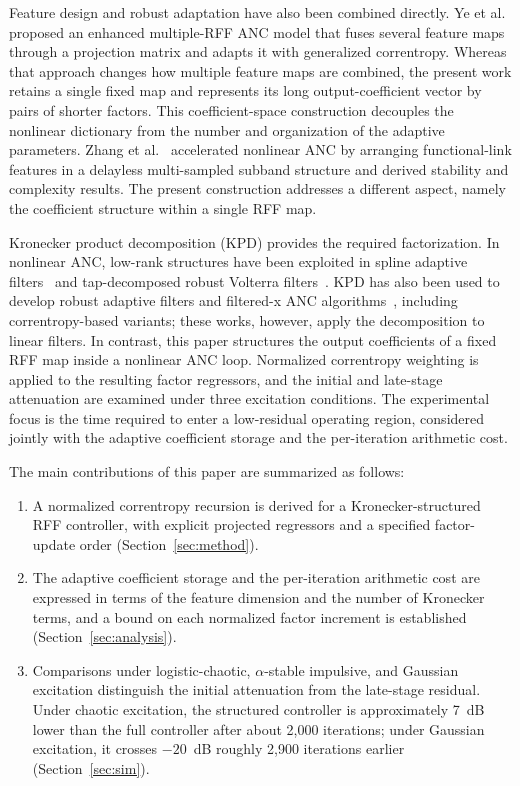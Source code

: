 \documentclass[preprint,12pt]{elsarticle}
\begin{document}
Feature design and robust adaptation have also been combined directly. Ye et al.~\cite{ye2025} proposed an enhanced multiple-RFF ANC model that fuses several feature maps through a projection matrix and adapts it with generalized correntropy. Whereas that approach changes how multiple feature maps are combined, the present work retains a single fixed map and represents its long output-coefficient vector by pairs of shorter factors. This coefficient-space construction decouples the nonlinear dictionary from the number and organization of the adaptive parameters. Zhang et al.~\cite{zhang2023} accelerated nonlinear ANC by arranging functional-link features in a delayless multi-sampled subband structure and derived stability and complexity results. The present construction addresses a different aspect, namely the coefficient structure within a single RFF map.

Kronecker product decomposition (KPD) provides the required factorization. In nonlinear ANC, low-rank structures have been exploited in spline adaptive filters~\cite{bhatta2022} and tap-decomposed robust Volterra filters~\cite{yin2024}. KPD has also been used to develop robust adaptive filters and filtered-x ANC algorithms~\cite{bhatta2020,li2025,lee2025}, including correntropy-based variants; these works, however, apply the decomposition to linear filters. In contrast, this paper structures the output coefficients of a fixed RFF map inside a nonlinear ANC loop. Normalized correntropy weighting is applied to the resulting factor regressors, and the initial and late-stage attenuation are examined under three excitation conditions. The experimental focus is the time required to enter a low-residual operating region, considered jointly with the adaptive coefficient storage and the per-iteration arithmetic cost.

The main contributions of this paper are summarized as follows:
\begin{enumerate}
\item A normalized correntropy recursion is derived for a Kronecker-structured RFF controller, with explicit projected regressors and a specified factor-update order (Section~\ref{sec:method}).
\item The adaptive coefficient storage and the per-iteration arithmetic cost are expressed in terms of the feature dimension and the number of Kronecker terms, and a bound on each normalized factor increment is established (Section~\ref{sec:analysis}).
\item Comparisons under logistic-chaotic, $\alpha$-stable impulsive, and Gaussian excitation distinguish the initial attenuation from the late-stage residual. Under chaotic excitation, the structured controller is approximately 7~dB lower than the full controller after about 2,000 iterations; under Gaussian excitation, it crosses $-20$~dB roughly 2,900 iterations earlier (Section~\ref{sec:sim}).
\end{enumerate}
\end{document}
